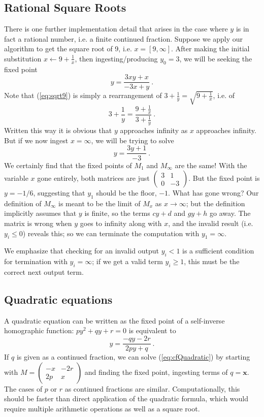 \documentclass[11pt, oneside]{amsart}   	%
\begin{document}
\subsection{Rational Square Roots}\label{sec:rational}
There is one further implementation detail that arises in the case where $y$ is in fact a rational number,
i.e. a finite continued fraction. Suppose we apply our algorithm to get the square root of 9, i.e. $x = [9,\infty]$.
After making the initial substitution $x \leftarrow 9 + \frac{1}{x}$, then ingesting/producing $y_0=3$,
we will be seeking the fixed point
\begin{equation}\label{eq:sqrt9}
y = \frac{3xy+x}{-3x+y}\ .
\end{equation}
Note that (\ref{eq:sqrt9}) is simply a rearrangement of $3+\frac{1}{y} = \sqrt{9+\frac{1}{x}}$, i.e. of
\[
3+\frac{1}{y} = \frac{9+\frac{1}{x}}{3+\frac{1}{y}}\ .
\]
Written this way it is obvious that $y$ approaches infinity as $x$ approaches infinity. But if we now ingest $x=\infty$, we will be trying to solve
\[
y = \frac{3y+1}{-3}\ .
\]
We certainly find that the fixed points of $M_1$ and $M_\infty$ are the same! With the variable $x$ gone entirely, both matrices are just
$\left(
\begin{smallmatrix} 
3 & 1 \\ 
0 & -3 
\end{smallmatrix}
\right)$. But the fixed point is $y=-1/6$, suggesting that $y_1$ should be the floor, $-1$. What has gone wrong? Our definition of $M_\infty$ is meant to be the limit of $M_x$ as $x \to \infty$; but the definition implicitly assumes that $y$ is finite, so the terms $cy+d$ and $gy+h$ go away. The matrix is wrong when $y$ goes to infinity along with $x$, and the invalid result (i.e. $y_i \leq 0$) reveals this; so we can terminate the computation with $y_1 = \infty$.

We emphasize that checking for an invalid output $y_i < 1$ is a sufficient condition for termination with $y_i=\infty$; if we get a valid term $y_i \geq 1$, this must be the correct next output term.


\subsection{Quadratic equations}
A quadratic equation can be written as the fixed point of a self-inverse homographic function:
$
py^2 + qy + r = 0
$
is equivalent to
\begin{equation}\label{eq:cfQuadratic}
y = \frac{-qy - 2r}{2py + q}\ .
\end{equation}
If $q$ is given as a continued fraction, we can solve (\ref{eq:cfQuadratic}) by starting with $M= \left(
\begin{smallmatrix} 
-x & -2r \\ 
2p & x 
\end{smallmatrix}
\right)$ and finding the fixed point, ingesting terms of  $q=\mathbf{x}$. The cases of $p$ or $r$ as continued fractions are similar.
Computationally, this should be faster than direct application of the quadratic formula, which would require multiple arithmetic operations as well as a square root.
\end{document}
